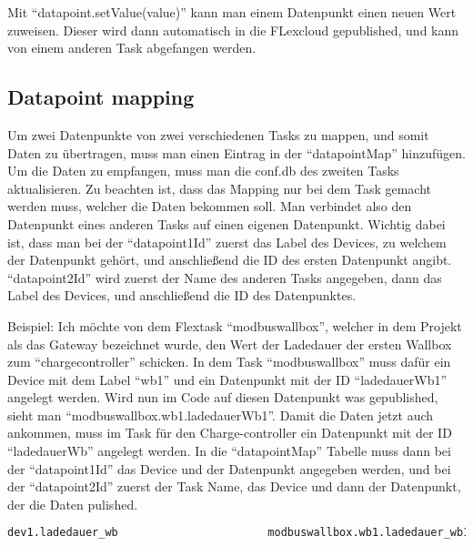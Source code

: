 Mit “datapoint.setValue(value)” kann man einem Datenpunkt einen neuen Wert zuweisen. Dieser wird dann automatisch in die FLexcloud gepublished, und kann von einem anderen Task abgefangen werden.  


\subsection{Datapoint mapping}

Um zwei Datenpunkte von zwei verschiedenen Tasks zu mappen, und somit Daten zu übertragen, muss man einen Eintrag in der “datapointMap” hinzufügen. Um die Daten zu empfangen, muss man die conf.db des zweiten Tasks aktualisieren. Zu beachten ist, dass das Mapping nur bei dem Task gemacht werden muss, welcher die Daten bekommen soll. Man verbindet also den Datenpunkt eines anderen Tasks auf einen eigenen Datenpunkt. Wichtig dabei ist, dass man bei der “datapoint1Id” zuerst das Label des Devices, zu welchem der Datenpunkt gehört, und anschließend die ID des ersten Datenpunkt angibt. “datapoint2Id” wird zuerst der Name des anderen Tasks angegeben, dann das Label des Devices, und anschließend die ID des Datenpunktes.  

Beispiel: Ich möchte von dem Flextask “modbuswallbox”, welcher in dem Projekt als das Gateway bezeichnet wurde, den Wert der Ladedauer der ersten Wallbox zum “chargecontroller” schicken. In dem Task “modbuswallbox” muss dafür ein Device mit dem Label “wb1” und ein Datenpunkt mit der ID “ladedauerWb1” angelegt werden. Wird nun im Code auf diesen Datenpunkt was gepublished, sieht man “modbuswallbox.wb1.ladedauerWb1”. Damit die Daten jetzt auch ankommen, muss im Task für den Charge-controller ein Datenpunkt mit der ID “ladedauerWb” angelegt werden. In die “datapointMap” Tabelle muss dann bei der “datapoint1Id” das Device und der Datenpunkt angegeben werden, und bei der “datapoint2Id” zuerst der Task Name, das Device und dann der Datenpunkt, der die Daten pulished.  





\begin{lstlisting}[language=sql,caption=Example Element,label=lst:impl:foo]
    dev1.ladedauer_wb                       modbuswallbox.wb1.ladedauer_wb1 
\end{lstlisting}